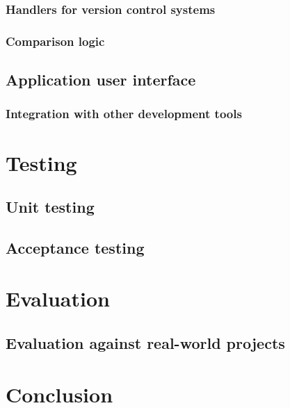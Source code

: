 \documentclass{l4proj}
\begin{document}

\label{VCSHandlers}
\subsection{Handlers for version control systems}

\subsection{Comparison logic}

\section{Application user interface}

\subsection{Integration with other development tools}

\chapter{Testing}

\section{Unit testing}

\section{Acceptance testing}

\chapter{Evaluation}


\section{Evaluation against real-world projects}


\chapter{Conclusion}
\end{document}

